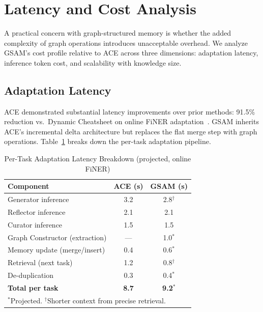 \documentclass[12pt,a4paper]{article}
\begin{document}
\section{Latency and Cost Analysis}
\label{sec:cost}

A practical concern with graph-structured memory is whether the added complexity of graph operations introduces unacceptable overhead. We analyze GSAM's cost profile relative to ACE across three dimensions: adaptation latency, inference token cost, and scalability with knowledge size.

\subsection{Adaptation Latency}

ACE demonstrated substantial latency improvements over prior methods: 91.5\% reduction vs.\ Dynamic Cheatsheet on online FiNER adaptation~\cite{ace2025}. GSAM inherits ACE's incremental delta architecture but replaces the flat merge step with graph operations. Table~\ref{tab:latency-breakdown} breaks down the per-task adaptation pipeline.

\begin{table}[t]
\centering
\caption{Per-Task Adaptation Latency Breakdown (projected, online FiNER)}
\label{tab:latency-breakdown}
\small
\begin{tabular}{@{}lcc@{}}
\toprule
\textbf{Component} & \textbf{ACE (s)} & \textbf{GSAM (s)} \\
\midrule
Generator inference & 3.2 & 2.8$^{\dagger}$ \\
Reflector inference & 2.1 & 2.1 \\
Curator inference & 1.5 & 1.5 \\
Graph Constructor (extraction) & --- & 1.0$^*$ \\
Memory update (merge/insert) & 0.4 & 0.6$^*$ \\
Retrieval (next task) & 1.2 & 0.8$^{\dagger}$ \\
De-duplication & 0.3 & 0.4$^*$ \\
\midrule
\textbf{Total per task} & \textbf{8.7} & \textbf{9.2}$^*$ \\
\bottomrule
\multicolumn{3}{l}{\scriptsize $^*$Projected. $^{\dagger}$Shorter context from precise retrieval.}
\end{tabular}
\end{table}
\end{document}
